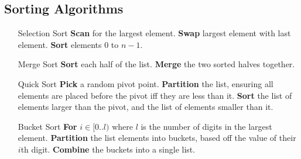 \documentclass[landscape]{cheat}
\begin{document}
\begin{multicols}{3}
\section{Sorting Algorithms}
\begin{itemize}
    \item[Selection Sort]
        \textbf{Scan} for the largest element.
        \textbf{Swap} largest element with last element.
        \textbf{Sort} elements 0 to $n-1$.
    \item[Merge Sort]
        \textbf{Sort} each half of the list.
        \textbf{Merge} the two sorted halves together.
    \item[Quick Sort]
        \textbf{Pick} a random pivot point.
        \textbf{Partition} the list, ensuring all elements are placed before the pivot iff they are less than it.
        \textbf{Sort} the list of elements larger than the pivot, and the list of elements smaller than it.
    \item[Bucket Sort]
        \textbf{For} $i \in [0..l)$ where $l$ is the number of digits in the largest element.
        \textbf{Partition} the list elements into buckets, based off the value of their $i$th digit.
        \textbf{Combine} the buckets into a single list.
\end{itemize}

\end{multicols}
\end{document}
